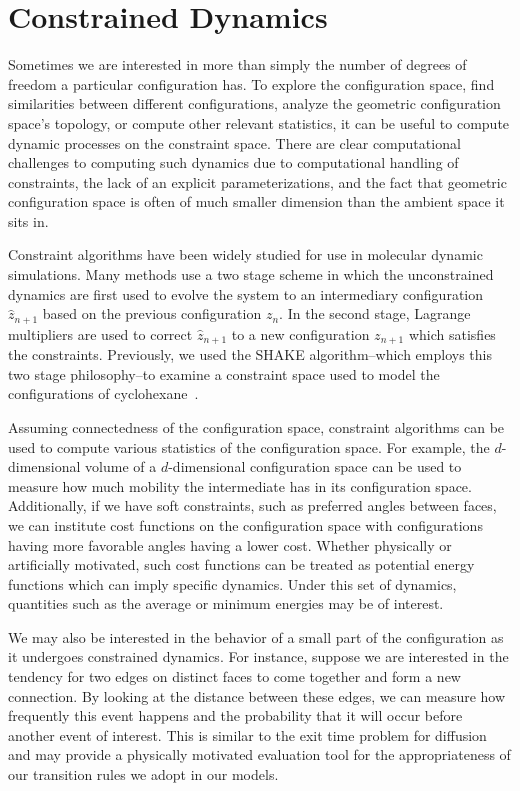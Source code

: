 \section{Constrained Dynamics}

Sometimes we are interested in more than simply the number of degrees of freedom a particular configuration has. To explore the configuration space, find similarities between different configurations, analyze the geometric configuration space's topology, or compute other relevant statistics, it can be useful to compute dynamic processes on the constraint space. There are clear computational challenges to computing such dynamics due to computational handling of constraints, the lack of an explicit parameterizations, and the fact that geometric configuration space is often of much smaller dimension than the ambient space it sits in.

Constraint algorithms have been widely studied for use in molecular dynamic simulations. Many  methods use a two stage scheme in which the unconstrained dynamics are first used to evolve the system to an intermediary configuration $\hat{z}_{n+1}$ based on the previous configuration $z_n$. In the second stage, Lagrange multipliers are used to correct $\hat{z}_{n+1}$ to a new configuration $z_{n+1}$ which satisfies the constraints. Previously, we used the SHAKE algorithm--which employs this two stage philosophy--to examine a constraint space used to model the configurations of cyclohexane~\cite{Pandey2014}. 

Assuming connectedness of the configuration space, constraint algorithms can be used to compute various statistics of the configuration space. For example, the $d$-dimensional volume of a $d$-dimensional configuration space can be used to measure how much mobility the intermediate has in its configuration space. Additionally, if we have soft constraints, such as preferred angles between faces, we can institute cost functions on the configuration space with configurations having more favorable angles having a lower cost. Whether physically or artificially motivated, such cost functions can be treated as potential energy functions which can imply specific dynamics. Under this set of dynamics, quantities such as the average or minimum energies may be of interest. 

We may also be interested in the behavior of a small part of the configuration as it undergoes constrained dynamics. For instance, suppose we are interested in the tendency for two edges on distinct faces to come together and form a new connection. By looking at the distance between these edges, we can measure how frequently this event happens and the probability that it will occur before another event of interest. This is similar to the exit time problem for diffusion and may provide a physically motivated evaluation tool for the appropriateness of our transition rules we adopt in our models. 


